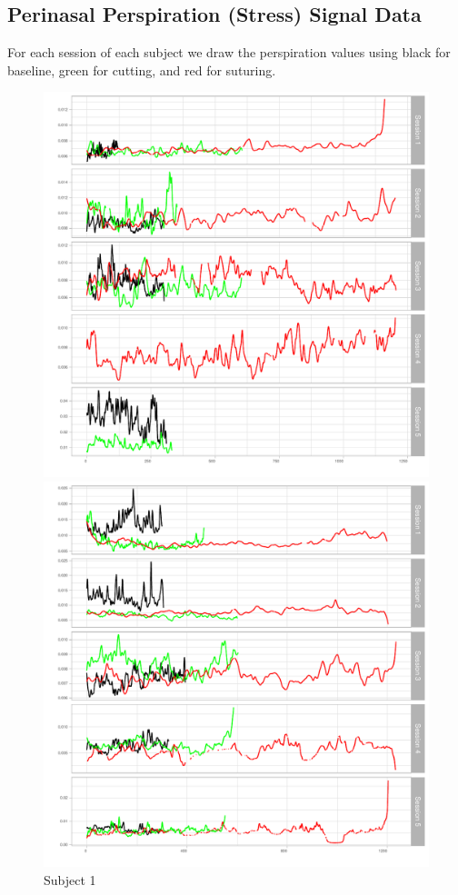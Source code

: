 \documentclass[12pt,epsf]{report}
\begin{document}
\subsection*{Perinasal Perspiration (Stress) Signal Data}
For each session of each subject  we draw the perspiration values using black for baseline, green for cutting, and red for suturing. 
\begin{figure}[!htb]
	\begin{minipage}[c]{0.5\linewidth}
	\includegraphics[width=\linewidth]{01_Perinasal_Perspiration.pdf}
	\caption{Subject 1 }
	\end{minipage}
	\hfill
	\begin{minipage}[c]{0.5\linewidth}
	\includegraphics[width=\linewidth]{02_Perinasal_Perspiration.pdf}

\end{minipage}
\end{figure}
\end{document}
